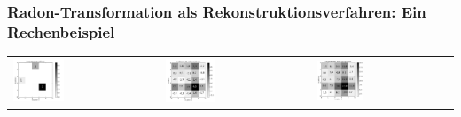         \subsubsection{Radon-Transformation als Rekonstruktionsverfahren: Ein Rechenbeispiel} \label{dfs:Radon}
        \begin{tabular}{p{5.3cm}p{5.3cm}p{5.3cm}}
                	\includegraphics[width=0.36\textwidth, height=0.2\textheight]{pic/radonInp.png}
                    & 
                    \includegraphics[width=0.36\textwidth, height=0.2\textheight]{pic/radonGef.png}
                    &
                  	\includegraphics[width=0.355\textwidth, height=0.19\textheight]{pic/radonUngef.png}                                     
         \end{tabular}
         \label{dfd:Radon}
         \vspace{3mm}  
        